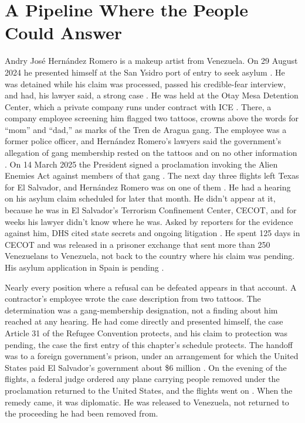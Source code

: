 \chapter{A Pipeline Where the People Could Answer}
\label{sec:11}
Andry José Hernández Romero is a makeup artist from Venezuela. On 29 August 2024 he presented himself at the San Ysidro port of entry to seek asylum \autocite{LULAC2025HernandezRomero}. He was detained while his claim was processed, passed his credible-fear interview, and had, his lawyer said, a strong case \autocite{Vega2025HernandezRomero}. He was held at the Otay Mesa Detention Center, which a private company runs under contract with ICE \autocite{LULAC2025HernandezRomero}. There, a company employee screening him flagged two tattoos, crowns above the words for “mom” and “dad,” as marks of the Tren de Aragua gang. The employee was a former police officer, and Hernández Romero's lawyers said the government's allegation of gang membership rested on the tattoos and on no other information \autocite{Palomera2025Blade}. On 14 March 2025 the President signed a proclamation invoking the Alien Enemies Act against members of that gang \autocite{procl10903}. The next day three flights left Texas for El Salvador, and Hernández Romero was on one of them \autocite{LULAC2025HernandezRomero,jgg2025contempt}. He had a hearing on his asylum claim scheduled for later that month. He didn't appear at it, because he was in El Salvador's Terrorism Confinement Center, CECOT, and for weeks his lawyer didn't know where he was. Asked by reporters for the evidence against him, DHS cited state secrets and ongoing litigation \autocite{Vega2025HernandezRomero}. He spent 125 days in CECOT and was released in a prisoner exchange that sent more than 250 Venezuelans to Venezuela, not back to the country where his claim was pending. His asylum application in Spain is pending \autocite{Wiggins2026Spain}.

Nearly every position where a refusal can be defeated appears in that account. A contractor's employee wrote the case description from two tattoos. The determination was a gang-membership designation, not a finding about him reached at any hearing. He had come directly and presented himself, the case Article 31 of the Refugee Convention protects, and his claim to protection was pending, the case the first entry of this chapter's schedule protects. The handoff was to a foreign government's prison, under an arrangement for which the United States paid El Salvador's government about \$6 million \autocite{Renteria2025ElSalvador}. On the evening of the flights, a federal judge ordered any plane carrying people removed under the proclamation returned to the United States, and the flights went on \autocite{jgg2025contempt}. When the remedy came, it was diplomatic. He was released to Venezuela, not returned to the proceeding he had been removed from.

